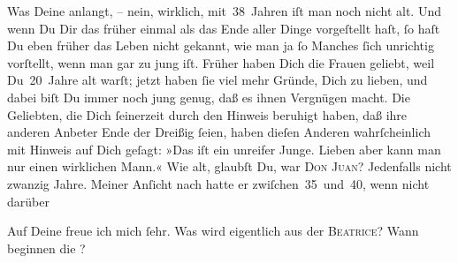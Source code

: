 \pstart
           Was Deine \label{K_L02911-2v}\label{K_L02911-2} anlangt, – nein, wirklich, mit 38 Jahren iſt man noch nicht alt.
               Und wenn Du Dir das früher einmal als das Ende aller Dinge vorgeſtellt haſt, ſo haſt
               Du eben früher das Leben nicht gekannt, wie man ja ſo Manches ſich unrichtig
               vorſtellt, wenn man gar zu jung iſt. Früher haben Dich die Frauen geliebt, weil
               Du 20 Jahre alt warſt; jetzt haben ſie viel mehr Gründe, Dich zu lieben, und dabei
               biſt Du immer noch jung genug, daß es ihnen Vergnügen macht. Die Geliebten, die Dich
               ſeinerzeit durch \introOben{}den\introOben{} Hinweis  beruhigt haben, daß ihre anderen Anbeter Ende der Dreißig ſeien, haben
               dieſen Anderen wahrſcheinlich mit Hinweis auf Dich geſagt: »Das iſt {\pb}ein unreifer Junge. Lieben aber kann man nur einen
               wirklichen Mann.« Wie alt, glaubſt Du, war \textsc{Don Juan}?
               Jedenfalls nicht zwanzig Jahre. Meiner Anſicht nach hatte er zwiſchen 35 und 40, wenn
               nicht darüber{\dotsseven}\pend
           
\pstart
           Auf Deine \label{K_L02911-3v}\label{K_L02911-3} freue ich mich ſehr. Was wird eigentlich aus der \textsc{Beatrice}? Wann beginnen die \label{K_L02911-4v}\label{K_L02911-4}?\pend
           

